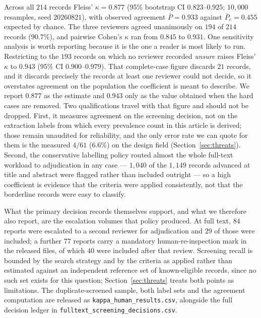 \documentclass[review,authoryear]{elsarticle}
\begin{document}
Across all $214$ records Fleiss' $\kappa = 0.877$ (95\% bootstrap CI $0.823$--$0.925$;
$10{,}000$ resamples, seed $20260821$), with observed agreement $\bar{P} = 0.933$ against
$\bar{P}_e = 0.455$ expected by chance. The three reviewers agreed unanimously on $194$
of $214$ records ($90.7\%$), and pairwise Cohen's $\kappa$ ran from $0.845$ to $0.931$.
One sensitivity analysis is worth reporting because it is the one a reader is most likely
to run. Restricting to the $193$ records on which no reviewer recorded \emph{unsure}
raises Fleiss' $\kappa$ to $0.943$ (95\% CI $0.900$--$0.979$). That complete-case figure
discards $21$ records, and it discards precisely the records at least one reviewer could
not decide, so it overstates agreement on the population the coefficient is meant to
describe. We report $0.877$ as the estimate and $0.943$ only as the value obtained when
the hard cases are removed.
Two qualifications travel with that figure and should not be dropped. First, it measures
agreement on the screening decision, not on the extraction labels from which every
prevalence count in this article is derived; those remain unaudited for reliability, and
the only error rate we can quote for them is the measured $4/61$ ($6.6\%$) on the design
field (Section~\ref{sec:threats}). Second, the conservative labelling policy routed
almost the whole full-text workload to adjudication in any case --- $1{,}040$ of the
$1{,}149$ records advanced at title and abstract were flagged rather than included
outright --- so a high coefficient is evidence that the criteria were applied
consistently, not that the borderline records were easy to classify.

What the primary decision records themselves support, and what we therefore also report,
are the escalation volumes that policy produced. At full text, $84$ reports were
escalated to a second reviewer for adjudication and $29$ of those were included; a
further $77$ reports carry a mandatory human-re-inspection mark in the released files,
of which $40$ were included after that review. Screening recall is bounded by the search
strategy and by the criteria as applied rather than estimated against an independent
reference set of known-eligible records, since no such set exists for this question;
Section~\ref{sec:threats} treats both points as limitations. The duplicate-screened
sample, both label sets and the agreement computation are released as
\texttt{kappa\_human\_results.csv}, alongside the full decision ledger in
\texttt{fulltext\_screening\_decisions.csv}.
\end{document}
